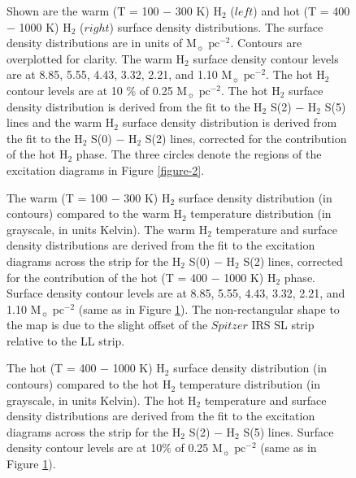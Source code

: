 \documentclass[manuscript]{aastex}
\begin{document}
\clearpage

\begin{figure}
\caption{Shown are the warm (T = 100 $-$ 300 K) 
$\mathrm{H_2}$ ($left$) and hot (T = 400 $-$ 1000 K) 
$\mathrm{H_2}$ ($right$) surface density distributions.  The surface density
 distributions are in units of $\mathrm{M_\sun}$ 
$\mathrm{pc^{-2}}$.   Contours are overplotted for clarity.  
The warm $\mathrm{H_2}$ surface density contour levels are at 
8.85, 5.55, 4.43, 3.32, 2.21, and 1.10 $\mathrm{M_\sun}$ 
$\mathrm{pc^{-2}}$.  The hot $\mathrm{H_2}$ contour 
levels are at 10 \% of 0.25 $\mathrm{M_\sun}$ $\mathrm{pc^{-2}}$.  
The hot $\mathrm{H_2}$ surface density distribution is derived 
from the fit to the $\mathrm{H_2}$ S(2) $-$ 
$\mathrm{H_2}$ S(5) lines and the warm $\mathrm{H_2}$ 
surface density distribution is derived from the fit to the 
$\mathrm{H_2}$ S(0) $-$ $\mathrm{H_2}$ S(2) lines, 
corrected for the contribution of the hot $\mathrm{H_2}$ phase.
The three circles denote the regions of the excitation diagrams in Figure \ref{figure-2}.}
\label{figure-3}
\end{figure}

\clearpage

\begin{figure}
\caption{The warm (T = 100 $-$ 300 K) $\mathrm{H_2}$ surface 
density distribution (in contours) compared 
to the warm $\mathrm{H_2}$ temperature distribution (in grayscale, in units Kelvin).  The warm $\mathrm{H_2}$ temperature and surface density distributions are derived from the fit to the excitation 
diagrams across the strip for the $\mathrm{H_2}$ S(0) $-$ $\mathrm{H_2}$ S(2) lines, 
corrected for the contribution of the hot (T = 400 $-$ 1000 K) $\mathrm{H_2}$ phase.  
Surface density contour levels are at 8.85, 5.55, 4.43, 3.32, 2.21, and 1.10 
$\mathrm{M_\sun}$ $\mathrm{pc^{-2}}$ (same as in Figure \ref{figure-3}). 
The non-rectangular shape to the map is due to the slight offset of the $Spitzer$ IRS SL 
strip relative to the LL strip.}
\label{figure-4}
\end{figure}

\clearpage
\begin{figure}
\caption{The hot (T = 400 $-$ 1000 K) $\mathrm{H_2}$ surface density distribution (in contours) compared to the hot $\mathrm{H_2}$ temperature distribution (in grayscale, in units Kelvin).  The hot $\mathrm{H_2}$ temperature and surface density distributions are derived from the fit to the excitation diagrams across the strip for the $\mathrm{H_2}$ S(2) $-$ $\mathrm{H_2}$ S(5) lines.  Surface density 
contour levels are at 10\% of 0.25 $\mathrm{M_\sun}$ $\mathrm{pc^{-2}}$ (same as in Figure \ref{figure-3}).}
\label{figure-5}
\end{figure}
\end{document}
